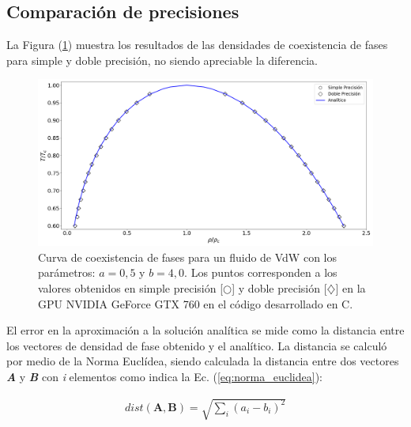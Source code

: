 \newpage
\subsection{Comparación de precisiones}

La Figura (\ref{fig:v_760_MxC_c_comparacion}) muestra los resultados de las densidades de coexistencia de fases para simple y doble precisión, no siendo apreciable la diferencia.

\begin{figure}[htbp]
	\centering
	\includegraphics[width=\textwidth]{figs/cap4/v_760_MxC_c_comparacion}
	\caption{Curva de coexistencia de fases para un fluido de VdW con los parámetros: $a = 0,5 $ y $b = 4,0 $. Los puntos corresponden a los valores obtenidos en simple precisión [$\bigcirc$] y doble precisión [$\diamondsuit$] en la GPU NVIDIA GeForce GTX 760 en el código desarrollado en \textsc{C}.} 
	\label{fig:v_760_MxC_c_comparacion}	
\end{figure}



El error en la aproximación a la solución analítica se mide como la distancia entre los vectores de densidad de fase obtenido y el analítico. La distancia se calculó por medio de la Norma Euclídea, siendo calculada la distancia entre dos vectores \textbf{\textit{A}} y \textbf{\textit{B}} con \textit{i} elementos como indica la Ec. (\ref{eq:norma_euclidea}):

\begin{align}
dist(\mathbf{A},\mathbf{B}) = \sqrt{\sum_i {\left( a_i - b_i \right)}^2  }
\label{eq:norma_euclidea}
\end{align}

